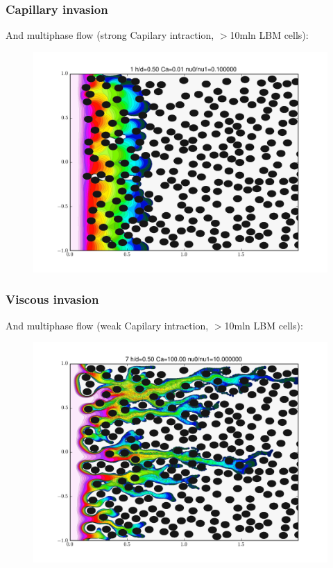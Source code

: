 \documentclass[10pt,handout]{beamer}
\begin{document}
\begin{frame}\frametitle{Capillary invasion}
And multiphase flow (strong Capilary intraction, $>$10mln LBM cells):
\begin{center}
\begin{figure}
\includegraphics[width = 1 \textwidth]{obrazki_md/invasion/1.png} 
\end{figure}
\end{center}
\end{frame}


\begin{frame}\frametitle{Viscous invasion}
And multiphase flow (weak Capilary intraction, $>$10mln LBM cells):
\begin{center}
\begin{figure}
\includegraphics[width = 1 \textwidth]{obrazki_md/invasion/7.png} 
\end{figure}
\end{center}
\end{frame}
\end{document}
